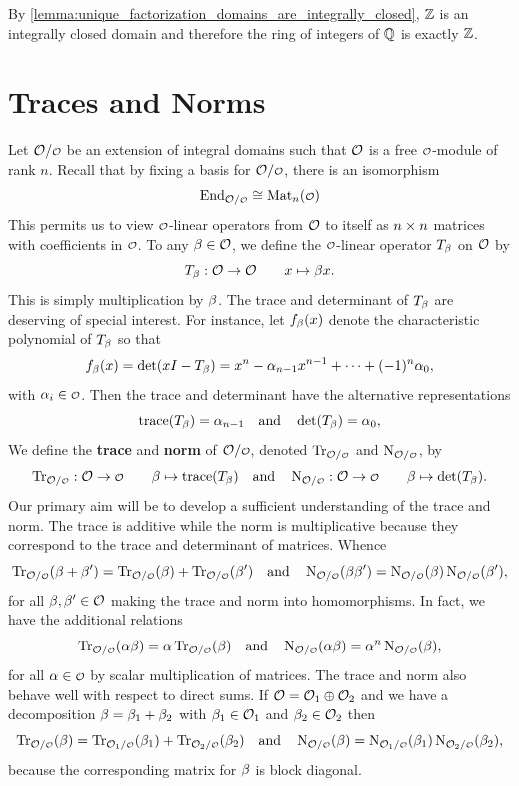       \begin{remark}\label{rem:integers_are_integrally_closed}
        By \cref{lemma:unique_factorization_domains_are_integrally_closed}, \(\mathbb{Z}\) is an integrally closed domain and therefore the ring of integers of \(\mathbb{Q}\) is exactly \(\mathbb{Z}\).
      \end{remark}
  \section{Traces and Norms}
    Let \(\mc{O}/\smc{O}\) be an extension of integral domains such that \(\mathcal{O}\) is a free \(\smc{O}\)-module of rank \(n\). Recall that by fixing a basis for \(\mc{O}/\smc{O}\), there is an isomorphism
    \[
      \End_{\mc{O}/\smc{O}} \cong \Mat_{n}(\smc{O})
    \]
    This permits us to view \(\smc{O}\)-linear operators from \(\mathcal{O}\) to itself as \(n \times n\) matrices with coefficients in \(\smc{O}\). To any \(\beta \in \mathcal{O}\), we define the \(\smc{O}\)-linear operator \(T_{\beta}\) on \(\mathcal{O}\) by
    \[
      T_{\beta}:\mathcal{O} \to \mathcal{O} \qquad x \mapsto \beta x.
    \]
    This is simply multiplication by \(\beta\). The trace and determinant of \(T_{\beta}\) are deserving of special interest. For instance, let \(f_{\beta}(x)\) denote the characteristic polynomial of \(T_{\beta}\) so that
    \[
      f_{\beta}(x) = \det(xI-T_{\beta}) = x^{n}-\alpha_{n-1}x^{n-1}+\cdots+(-1)^{n}\alpha_{0},
    \]
    with \(\a_{i} \in \smc{O}\). Then the trace and determinant have the alternative representations
    \[
      \operatorname{\mathrm{trace}}(T_{\beta}) = \alpha_{n-1} \quad \text{and} \quad \det(T_{\beta}) = \alpha_{0},
    \]
    We define the \textbf{trace} and \textbf{norm} of \(\mc{O}/\smc{O}\), denoted \(\Trace_{\mc{O}/\smc{O}}\) and \(\Norm_{\mc{O}/\smc{O}}\), by
    \[
      \Trace_{\mc{O}/\smc{O}}:\mc{O} \to \smc{O} \qquad \b \mapsto \tr(T_{\b}) \quad \text{and} \quad \Norm_{\mc{O}/\smc{O}}:\mc{O} \to \smc{O} \qquad \b \mapsto \det(T_{\b}).
    \]
    Our primary aim will be to develop a sufficient understanding of the trace and norm. The trace is additive while the norm is multiplicative because they correspond to the trace and determinant of matrices. Whence
    \[
      \Trace_{\mc{O}/\smc{O}}(\b+\b') = \Trace_{\mc{O}/\smc{O}}(\b)+\Trace_{\mc{O}/\smc{O}}(\b') \quad \text{and} \quad \Norm_{\mc{O}/\smc{O}}(\b\b') = \Norm_{\mc{O}/\smc{O}}(\b)\Norm_{\mc{O}/\smc{O}}(\b'),
    \]
    for all \(\beta,\beta' \in \mathcal{O}\) making the trace and norm into homomorphisms. In fact, we have the additional relations
    \[
      \Trace_{\mc{O}/\smc{O}}(\a\b) = \a\Trace_{\mc{O}/\smc{O}}(\b) \quad \text{and} \quad \Norm_{\mc{O}/\smc{O}}(\a\b) = \a^{n}\Norm_{\mc{O}/\smc{O}}(\b),
    \]
    for all \(\a \in \smc{O}\) by scalar multiplication of matrices. The trace and norm also behave well with respect to direct sums. If \(\mathcal{O} = \mathcal{O}_{1} \oplus \mathcal{O}_{2}\) and we have a decomposition \(\beta = \beta_{1}+\beta_{2}\) with \(\beta_{1} \in \mathcal{O}_{1}\) and \(\beta_{2} \in \mathcal{O}_{2}\) then
    \[
      \Trace_{\mc{O}/\smc{O}}(\b) = \Trace_{\mc{O}_{1}/\smc{O}}(\b_{1})+\Trace_{\mc{O}_{2}/\smc{O}}(\b_{2}) \quad \text{and} \quad \Norm_{\mc{O}/\smc{O}}(\b) = \Norm_{\mc{O}_{1}/\smc{O}}(\b_{1})\Norm_{\mc{O}_{2}/\smc{O}}(\b_{2}),
    \]
    because the corresponding matrix for \(\beta\) is block diagonal.

